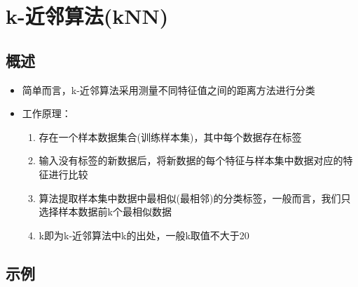 \documentclass[11pt]{ctexart}
\begin{document}
\section{k-近邻算法(kNN)}
\label{sec:orgheadline11}
\subsection{概述}
\label{sec:orgheadline2}
\begin{itemize}
\item 简单而言，k-近邻算法采用测量不同特征值之间的距离方法进行分类
\item 工作原理：
\begin{enumerate}
\item 存在一个样本数据集合(训练样本集)，其中每个数据存在标签
\item 输入没有标签的新数据后，将新数据的每个特征与样本集中数据对应的特征进行比较
\item 算法提取样本集中数据中最相似(最相邻)的分类标签，一般而言，我们只选择样本数据前k个最相似数据
\item k即为k-近邻算法中k的出处，一般k取值不大于20
\end{enumerate}
\end{itemize}
\subsection{示例}
\label{sec:orgheadline10}
\end{document}
